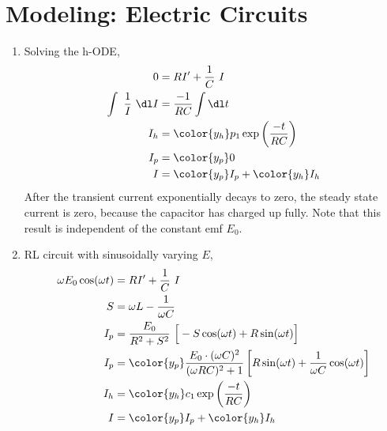 \section{Modeling: Electric Circuits}

\begin{enumerate}
    \item Solving the h-ODE,
          \begin{align}
              0                         & = RI' + \frac{1}{C}\ I                    \\
              \int\  \frac{1}{I}\ \dl I & = \frac{-1}{RC}\int \dl t                 \\
              I_{h}                     & = {\color{y_h} p_{1}\exp
              \left( \frac{-t}{RC} \right)}                                         \\
              I_{p}                     & = {\color{y_p} 0}                         \\
              I                         & ={\color{y_p} I_{p}} + {\color{y_h}I_{h}}
          \end{align}
          After the transient current exponentially decays to zero, the steady state
          current is zero, because the capacitor has charged up fully. Note that this
          result is independent of the constant emf $ E_{0} $.

    \item RL circuit with sinusoidally varying $ E $,
          \begin{align}
              \omega E_{0}\cos(\omega t) & = RI' + \frac{1}{C}\ I                 \\
              S                          & = \omega L - \frac{1}{\omega C}        \\
              I_{p}                      & = \frac{E_{0}}{R^{2} + S^{2}}
              \ \Big[-S\cos(\omega t) + R\sin(\omega t)\Big]                      \\
              I_{p}                      & = {\color{y_p} \frac{E_{0}
                  \cdot (\omega C)^{2}}{(\omega RC)^{2} + 1}
              \left[ R\sin(\omega t) + \frac{1}{\omega C} \cos(\omega t) \right]} \\
              I_h                        & = {\color{y_h} c_{1}
              \exp\left( \frac{-t}{RC} \right)}                                   \\
              I                          & ={\color{y_p} I_{p}}
              + {\color{y_h}I_{h}}
          \end{align}


\end{enumerate}
